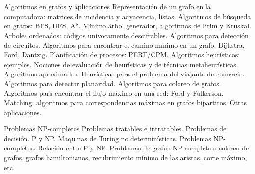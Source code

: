 Algoritmos en grafos y aplicaciones Representación de un grafo en la computadora: matrices de incidencia y adyacencia, listas. Algoritmos de búsqueda en grafos: BFS, DFS, A*. Mínimo árbol generador, algoritmos de Prim y Kruskal. Arboles ordenados: códigos unívocamente descifrables. Algoritmos para detección de circuitos. Algoritmos para encontrar el camino mínimo en un grafo: Dijkstra, Ford, Dantzig. Planificación de procesos: PERT/CPM. Algoritmos heurísticos: ejemplos. Nociones de evaluación de heurísticas y de técnicas metaheurísticas. Algoritmos aproximados. Heurísticas para el problema del viajante de comercio. Algoritmos para detectar planaridad. Algoritmos para coloreo de grafos. Algoritmos para encontrar el flujo máximo en una red: Ford y Fulkerson. Matching: algoritmos para correspondencias máximas en grafos bipartitos. Otras aplicaciones.



Problemas NP-completos Problemas tratables e intratables. Problemas de decisión. P y NP. Maquinas de Turing no determinísticas. Problemas NP-completos. Relación entre P y NP. Problemas de grafos NP-completos: coloreo de grafos, grafos hamiltonianos, recubrimiento mínimo de las aristas, corte máximo, etc.


